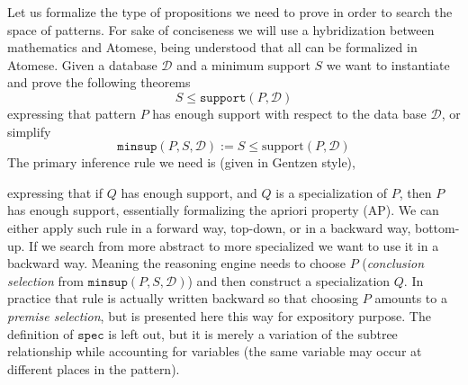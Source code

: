 \documentclass[runningheads]{llncs}
\begin{document}
Let us formalize the type of propositions we need to prove in order to
search the space of patterns. For sake of conciseness we will use a
hybridization between mathematics and Atomese, being understood that
all can be formalized in Atomese.  Given a database $\mathcal{D}$ and
a minimum support $S$ we want to instantiate and prove the following
theorems
$$ S \le \texttt{support}(P, \mathcal{D}) $$ expressing that pattern
$P$ has enough support with respect to the data base $\mathcal{D}$, or
simplify
$$ \texttt{minsup}(P, S, \mathcal{D}) := S \le \text{support}(P,
\mathcal{D}) $$ The primary inference rule we need is (given in
Gentzen style),
\begin{prooftree}
\end{prooftree}
expressing that if $Q$ has enough support, and $Q$ is a specialization
of $P$, then $P$ has enough support, essentially formalizing the
apriori property (AP). We can either apply such rule in a forward way,
top-down, or in a backward way, bottom-up. If we search from more
abstract to more specialized we want to use it in a backward
way. Meaning the reasoning engine needs to choose $P$
(\emph{conclusion selection} from $\texttt{minsup}(P, S,
\mathcal{D})$) and then construct a specialization $Q$.  In practice
that rule is actually written backward so that choosing $P$ amounts to
a \emph{premise selection}, but is presented here this way for
expository purpose.  The definition of $\texttt{spec}$ is left out,
but it is merely a variation of the subtree relationship while
accounting for variables (the same variable may occur at different
places in the pattern).
\end{document}
